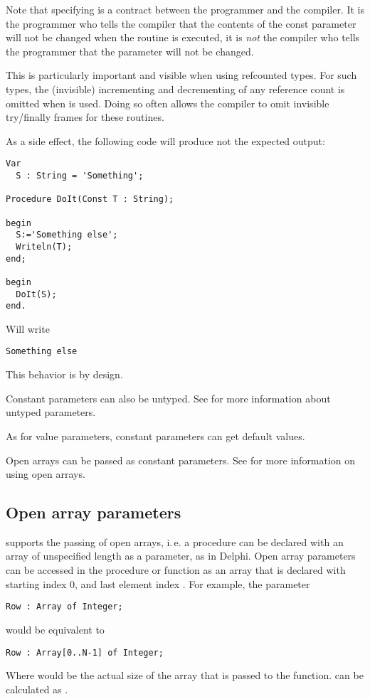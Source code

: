 \begin{remark}
Note that specifying  is a contract between the programmer and the
compiler. It is the programmer who tells the compiler that the contents of
the const parameter will not be changed when the routine is executed, it is
{\em not} the compiler who tells the programmer that the parameter will not be
changed.

This is particularly important and visible when using refcounted types.
For such types, the (invisible) incrementing and decrementing of any reference
count is omitted when  is used. Doing so often allows the compiler
to omit invisible try/finally frames for these routines.

As a side effect, the following code will produce not the expected output:
\begin{verbatim}
Var
  S : String = 'Something';

Procedure DoIt(Const T : String);

begin
  S:='Something else';
  Writeln(T);
end;

begin
  DoIt(S);
end.
\end{verbatim}
Will write
\begin{verbatim}
Something else
\end{verbatim}
This behavior is by design.
\end{remark}

Constant parameters can also be untyped. See  for more
information about untyped parameters.

As for value parameters, constant parameters can get default values.

Open arrays can be passed as constant parameters. See  for
more information on using open arrays.

\subsection{Open array parameters}
\label{se:openarray}
\fpc supports the passing of open arrays, i.\,e. a procedure can be declared
with an array of unspecified length as a parameter, as in Delphi.
Open array parameters can be accessed in the procedure or function as an
array that is declared with starting index 0, and last element
index .
For example, the parameter
\begin{verbatim}
Row : Array of Integer;
\end{verbatim}
would be equivalent to
\begin{verbatim}
Row : Array[0..N-1] of Integer;
\end{verbatim}
Where   would be the actual size of the array that is passed to the
function.  can be calculated as .

